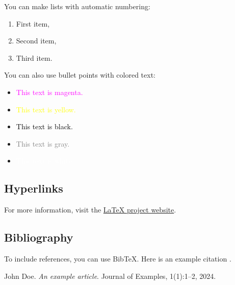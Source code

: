 \documentclass{article}
\begin{document}
	You can make lists with automatic numbering:
	\begin{enumerate}
		\item First item,
		\item Second item,
		\item Third item.
	\end{enumerate}
	
	You can also use bullet points with colored text:
	\begin{itemize}
		\item \textcolor{magenta}{This text is magenta.}
		\item \textcolor{yellow}{This text is yellow.}
		\item \textcolor{black}{This text is black.}
		\item \textcolor{gray}{This text is gray.}
		\item \textcolor{white}{This text is white.}
	\end{itemize}
	
	\subsection{Hyperlinks}
	
	For more information, visit the \href{https://www.google.com}{LaTeX project website}.
	
	\subsection{Bibliography}
	
	To include references, you can use BibTeX. Here is an example citation \cite{Doe24}.
	
	
	\begin{thebibliography}{9}
		 John Doe. \textit{An example article}. Journal of Examples, 1(1):1–2, 2024.
	\end{thebibliography}
	
\end{document}
